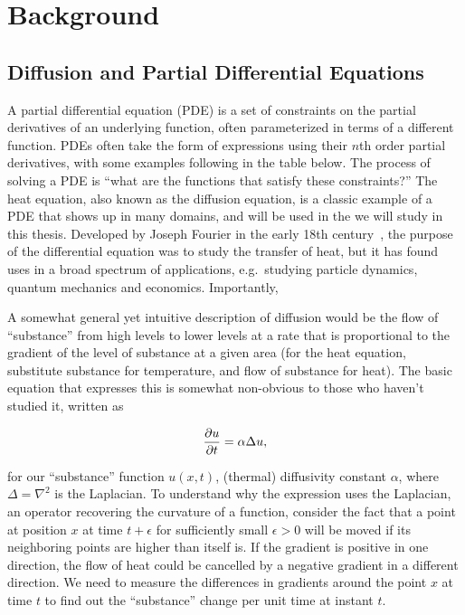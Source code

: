 \documentclass[../main.tex]{subfiles}
\begin{document}
    \chapter{Background}\label{ch:background}

    \section{Diffusion and Partial Differential Equations}\label{sec:diffusion}
    A partial differential equation (PDE) is a set of constraints on the partial derivatives of an underlying function, often parameterized in terms of a different function.
    PDEs often take the form of expressions using their $n$th order partial derivatives, with some examples following in the table below.
    The process of solving a PDE is ``what are the functions that satisfy these constraints?''
    The heat equation, also known as the diffusion equation, is a classic example of a PDE that shows up in many domains, and will be used in the  we will study in this thesis.
    Developed by Joseph Fourier in the early 18th century~\cite{narasimhanFourierHeatConduction1999}, the purpose of the differential equation was to study the transfer of heat, but it has found uses in a broad spectrum of applications, e.g.\ studying particle dynamics, quantum mechanics and economics.
    Importantly,

    A somewhat general yet intuitive description of diffusion would be the flow of ``substance'' from high levels to lower levels at a rate that is proportional to the gradient of the level of substance at a given area (for the heat equation, substitute substance for temperature, and flow of substance for heat).
    The basic equation that expresses this is somewhat non-obvious to those who haven't studied it, written as

    \begin{equation}
        \frac{\partial u}{\partial t} = \alpha\Delta u,\label{eq:basic-heat}
    \end{equation}

    for our ``substance'' function $u(x, t)$, (thermal) diffusivity constant $\alpha$, where $\Delta = \nabla^2$ is the Laplacian.
    To understand why the expression uses the Laplacian, an operator recovering the curvature of a function, consider the fact that a point at position $x$ at time $t + \epsilon$ for sufficiently small $\epsilon > 0$ will be moved if its
    neighboring points are higher than itself is.
    If the gradient is positive in one direction, the flow of heat could be cancelled by a negative gradient in a different direction.
    We need to measure the differences in gradients around the point $x$ at time $t$ to find out the ``substance'' change per unit time at instant $t$.
\end{document}
